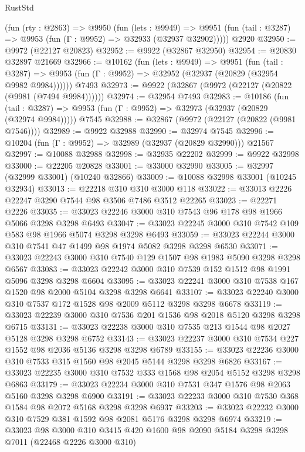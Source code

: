 \begin{lexlean}{RustStd}
\begin{coremodule}
    (fun (rty : @2863) =>
    @9950
      (fun (lets : @9949) =>
      @9951 (fun (tail : @3287) => @9953 (fun (Γ : @9952) => @32933 (@32937 @32902)))))
    @2920
@32950 := @9972 (@22127 @20823)
@32952 := @9922 (@32867 @32950)
@32954 := @20830 @32897 @21669
@32966 := @10162
    (fun (lets : @9949) =>
    @9951
      (fun (tail : @3287) =>
      @9953 (fun (Γ : @9952) => @32952 (@32937 (@20829 (@32954 @9982 @9984))))))
    @7493
@32973 := @9922 (@32867 (@9972 (@22127 (@20822 (@9981 (@7494 @9984))))))
@32974 := @32954 @7493
@32983 := @10186
    (fun (tail : @3287) => @9953 (fun (Γ : @9952) => @32973 (@32937 (@20829 (@32974 @9984)))))
    @7545
@32988 := @32867 (@9972 (@22127 (@20822 (@9981 @7546))))
@32989 := @9922 @32988
@32990 := @32974 @7545
@32996 := @10204 (fun (Γ : @9952) => @32989 (@32937 (@20829 @32990))) @21567
@32997 := @10088 @32988
@32998 := @32935 @22202
@32999 := @9922 @32998
@33000 := @22205 @20828
@33001 := @33000 @32990
@33005 := @32997 (@32999 @33001) (@10240 @32866)
@33009 := @10088 @32998 @33001 (@10245 @32934)
@33013 := @22218 @310 @310 @3000 @118
@33022 := @33013 @2226 @22247 @3290 @7544 @98 @3506 @7486 @3512 @22265
@33023 := @22271 @2226
@33035 := @33023 @22246 @3000 @310 @7543 @96 @178 @98 @1966 @5066 @3298 @3298 @6493
@33047 := @33023 @22245 @3000 @310 @7542 @109 @583 @98 @1966 @5074 @3298 @3298 @6493
@33059 := @33023 @22244 @3000 @310 @7541 @47 @1499 @98 @1974 @5082 @3298 @3298 @6530
@33071 := @33023 @22243 @3000 @310 @7540 @129 @1507 @98 @1983 @5090 @3298 @3298 @6567
@33083 := @33023 @22242 @3000 @310 @7539 @152 @1512 @98 @1991 @5096 @3298 @3298 @6604
@33095 := @33023 @22241 @3000 @310 @7538 @167 @1520 @98 @2000 @5104 @3298 @3298 @6641
@33107 := @33023 @22240 @3000 @310 @7537 @172 @1528 @98 @2009 @5112 @3298 @3298 @6678
@33119 := @33023 @22239 @3000 @310 @7536 @201 @1536 @98 @2018 @5120 @3298 @3298 @6715
@33131 := @33023 @22238 @3000 @310 @7535 @213 @1544 @98 @2027 @5128 @3298 @3298 @6752
@33143 := @33023 @22237 @3000 @310 @7534 @227 @1552 @98 @2036 @5136 @3298 @3298 @6789
@33155 := @33023 @22236 @3000 @310 @7533 @315 @1560 @98 @2045 @5144 @3298 @3298 @6826
@33167 := @33023 @22235 @3000 @310 @7532 @333 @1568 @98 @2054 @5152 @3298 @3298 @6863
@33179 := @33023 @22234 @3000 @310 @7531 @347 @1576 @98 @2063 @5160 @3298 @3298 @6900
@33191 := @33023 @22233 @3000 @310 @7530 @368 @1584 @98 @2072 @5168 @3298 @3298 @6937
@33203 := @33023 @22232 @3000 @310 @7529 @381 @1592 @98 @2081 @5176 @3298 @3298 @6974
@33219 := @33023
    @98
    @3000
    @310
    @3415
    @420
    @1600
    @98
    @2090
    @5184
    @3298
    @3298
    @7011
    (@22468 @2226 @3000 @310)

\end{coremodule}
\end{lexlean}
